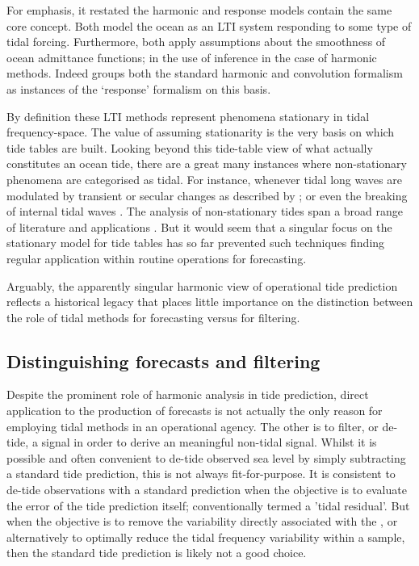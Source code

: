 For emphasis, it restated the harmonic and response models contain the same core concept.   Both model the ocean as an LTI system responding to some type of tidal forcing.   Furthermore, both apply assumptions about the smoothness of ocean admittance functions; in the use of inference in the case of harmonic methods.  Indeed \citep[chpt6]{Fu:2001ub} groups both the standard harmonic and convolution formalism as instances of the `response' formalism on this basis.

By definition these LTI methods represent phenomena stationary in tidal frequency-space.   The value of assuming stationarity is the very basis on which tide tables are built. 
Looking beyond this tide-table view of what actually constitutes an ocean tide, there are a great many instances where non-stationary phenomena are categorised as tidal.    For instance, whenever tidal long waves are modulated by transient or secular changes as described by \citet{Devlin:2017hu};   or even the breaking of internal tidal waves \citep{10.3389/fmars.2021.629372}.
The analysis of non-stationary tides span a broad range of literature and applications \citep{Jay:2003bj}.
But it would seem that a singular focus on the stationary model for tide tables has so far prevented such techniques finding regular application within routine operations for forecasting.  

Arguably, the apparently singular harmonic view of operational tide prediction reflects a historical legacy that places little importance on the distinction between the role of tidal methods for forecasting versus for filtering.

\subsection{Distinguishing forecasts and filtering}

Despite the prominent role of harmonic analysis in tide prediction, direct application to the production of forecasts is not actually the only reason for employing tidal methods in an operational agency.   
The other is to filter, or de-tide, a signal in order to derive an meaningful non-tidal signal.    Whilst it is possible and often convenient to de-tide observed sea level by simply subtracting a standard tide prediction, this is not always fit-for-purpose.
It is consistent to de-tide observations with a standard prediction when the objective is to evaluate the error of the tide prediction itself; conventionally termed a 'tidal residual'.
But when the objective is to remove the variability directly associated with the \ATGP{}, or alternatively to optimally reduce the tidal frequency variability within a sample, then the standard tide prediction is likely not a good choice.

